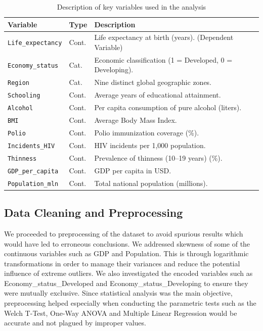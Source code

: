\documentclass[3pt, a4paper]{article}
\begin{document}
\begin{table}[H]
    \centering
    \small %
    \renewcommand{\arraystretch}{0.9} %
    \caption{Description of key variables used in the analysis}
    \label{tab:variables}
    \begin{tabularx}{\textwidth}{@{} l l X @{}}
        \toprule
        \textbf{Variable} & \textbf{Type} & \textbf{Description} \\
        \midrule
        \texttt{Life\_expectancy} & Cont. & Life expectancy at birth (years). (Dependent Variable) \\
        \texttt{Economy\_status} & Cat. & Economic classification (1 = Developed, 0 = Developing). \\
        \texttt{Region} & Cat. & Nine distinct global geographic zones. \\
        \texttt{Schooling} & Cont. & Average years of educational attainment. \\
        \texttt{Alcohol} & Cont. & Per capita consumption of pure alcohol (liters). \\
        \texttt{BMI} & Cont. & Average Body Mass Index. \\
        \texttt{Polio} & Cont. & Polio immunization coverage (\%). \\
        \texttt{Incidents\_HIV} & Cont. & HIV incidents per 1,000 population. \\
        \texttt{Thinness} & Cont. & Prevalence of thinness (10--19 years) (\%). \\
        \texttt{GDP\_per\_capita} & Cont. & GDP per capita in USD. \\
        \texttt{Population\_mln} & Cont. & Total national population (millions). \\
        \bottomrule
    \end{tabularx}
\end{table}

\subsection{Data Cleaning and Preprocessing}
We proceeded to preprocessing of the dataset to avoid spurious results which would have led to erroneous conclusions. We addressed skewness of some of the continuous variables such as GDP and Population. This is through logarithmic transformations in order to manage their variances and reduce the potential influence of extreme outliers. We also investigated the encoded variables such as Economy\_status\_Developed and Economy\_status\_Developing to ensure they were mutually exclusive. Since statistical analysis was the main objective, preprocessing helped especially when conducting the parametric tests such as the Welch T-Test, One-Way ANOVA and Multiple Linear Regression would be accurate and not plagued by improper values.
\end{document}
